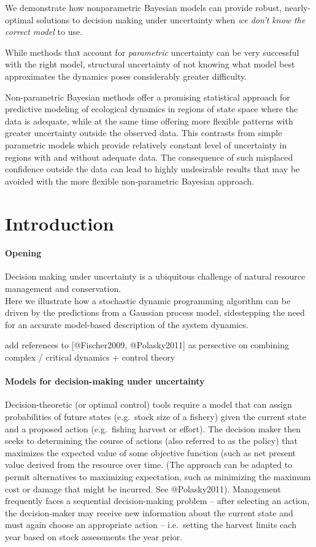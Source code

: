 \documentclass[author-year, review]{elsarticle} %
\begin{document}
We demonstrate how nonparametric Bayesian models can provide robust,
nearly-optimal solutions to decision making under uncertainty when
\emph{we don't know the correct model} to use.

While methods that account for \emph{parametric} uncertainty can be very
successful with the right model, structural uncertainty of not knowing
what model best approximates the dynamics poses considerably greater
difficulty.

Non-parametric Bayesian methods offer a promising statistical approach
for predictive modeling of ecological dynamics in regions of state space
where the data is adequate, while at the same time offering more
flexible patterns with greater uncertainty outside the observed data.
This contrasts from simple parametric models which provide relatively
constant level of uncertainty in regions with and without adequate data.
The consequence of such misplaced confidence outside the data can lead
to highly undesirable results that may be avoided with the more flexible
non-parametric Bayesian approach.

\section{Introduction}

\paragraph{Opening}

Decision making under uncertainty is a ubiquitous challenge of natural
resource management and conservation.\\Here we illustrate how a
stochastic dynamic programming algorithm can be driven by the
predictions from a Gaussian process model, sidestepping the need for an
accurate model-based description of the system dynamics.

add references to {[}@Fischer2009, @Polasky2011{]} as persective on
combining complex / critical dynamics + control theory

\paragraph{Models for decision-making under uncertainty}

Decision-theoretic (or optimal control) tools require a model that can
assign probabilities of future states (e.g.~stock size of a fishery)
given the current state and a proposed action (e.g.~fishing harvest or
effort). The decision maker then seeks to determining the course of
actions (also referred to as the policy) that maximizes the expected
value of some objective function (such as net present value derived from
the resource over time. (The approach can be adapted to permit
alternatives to maximizing expectation, such as minimizing the maximum
cost or damage that might be incurred. See @Polasky2011). Management
frequently faces a sequential decision-making problem -- after selecting
an action, the decision-maker may receive new information about the
current state and must again choose an appropriate action --
i.e.~setting the harvest limits each year based on stock assessments the
year prior.
\end{document}
